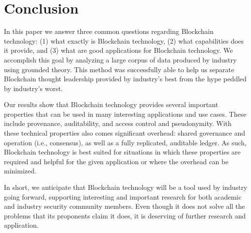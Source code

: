 
\section{Conclusion}
In this paper we answer three common questions regarding Blockchain technology: (1) what exactly is Blockchain technology, (2) what capabilities does it provide, and (3) what are good applications for Blockchain technology.
We accomplish this goal by analyzing a large corpus of data produced by industry using grounded theory.
This method was successfully able to help us separate Blockchain thought leadership provided by industry's best from the hype peddled by industry's worst.

Our results show that Blockchain technology provides several important properties that can be used in many interesting applications and use cases.  These include provenance, auditability, and access control and pseudonymity.
With these technical properties also comes significant overhead: shared governance and operation (i.e., consensus), as well as a fully replicated, auditable ledger.
As such, Blockchain technology is best suited for situations in which these properties are required and helpful for the given application or where the overhead can be minimized.

In short, we anticipate that Blockchain technology will be a tool used by industry going forward, supporting interesting and important research for both academic and industry security community members.
Even though it does not solve all the problems that its proponents claim it does, it is deserving of further research and application.
